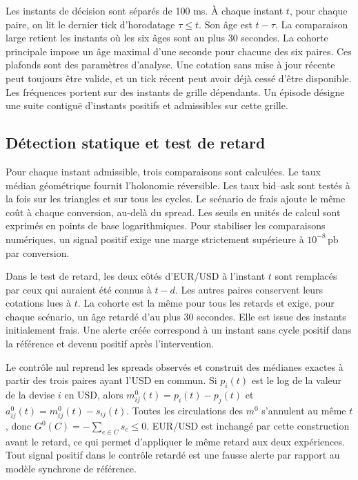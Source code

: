 \documentclass[11pt,a4paper]{article}
\theoremstyle{clair}
\newcommand{\pb}{\,\mathrm{pb}}
\begin{document}
Les instants de décision sont séparés de 100 ms. À chaque instant $t$, pour chaque paire, on lit le dernier tick d'horodatage $\tau\le t$. Son âge est $t-\tau$. La comparaison large retient les instants où les six âges sont au plus 30 secondes. La cohorte principale impose un âge maximal d'une seconde pour chacune des six paires. Ces plafonds sont des paramètres d'analyse. Une cotation sans mise à jour récente peut toujours être valide, et un tick récent peut avoir déjà cessé d'être disponible. Les fréquences portent sur des instants de grille dépendants. Un épisode désigne une suite contiguë d'instants positifs et admissibles sur cette grille.

\subsection{Détection statique et test de retard}

Pour chaque instant admissible, trois comparaisons sont calculées. Le taux médian géométrique fournit l'holonomie réversible. Les taux bid--ask sont testés à la fois sur les triangles et sur tous les cycles. Le scénario de frais ajoute le même coût à chaque conversion, au-delà du spread. Les seuils en unités de calcul sont exprimés en points de base logarithmiques. Pour stabiliser les comparaisons numériques, un signal positif exige une marge strictement supérieure à $10^{-8}\pb$ par conversion.

Dans le test de retard, les deux côtés d'EUR/USD à l'instant $t$ sont remplacés par ceux qui auraient été connus à $t-d$. Les autres paires conservent leurs cotations lues à $t$. La cohorte est la même pour tous les retards et exige, pour chaque scénario, un âge retardé d'au plus 30 secondes. Elle est issue des instants initialement frais. Une alerte créée correspond à un instant sans cycle positif dans la référence et devenu positif après l'intervention.

Le contrôle nul reprend les spreads observés et construit des médianes exactes à partir des trois paires ayant l'USD en commun. Si $p_i(t)$ est le log de la valeur de la devise $i$ en USD, alors $m^0_{ij}(t)=p_i(t)-p_j(t)$ et $a^0_{ij}(t)=m^0_{ij}(t)-s_{ij}(t)$. Toutes les circulations des $m^0$ s'annulent au même $t$, donc $G^0(C)=-\sum_{e\in C}s_e\le0$. EUR/USD est inchangé par cette construction avant le retard, ce qui permet d'appliquer le même retard aux deux expériences. Tout signal positif dans le contrôle retardé est une fausse alerte par rapport au modèle synchrone de référence.
\end{document}
